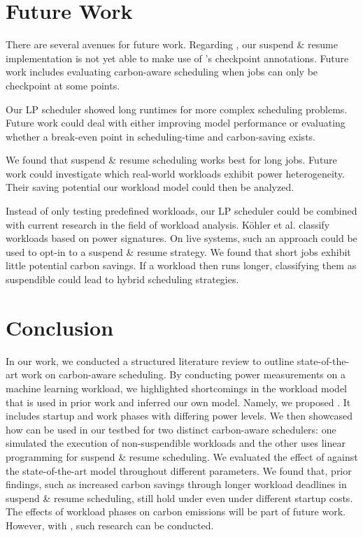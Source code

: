 \section{Future Work} \label{sec:future_work}

There are several avenues for future work.
Regarding \programname{}, our suspend \& resume implementation is not yet able to make use of \modelname{}'s checkpoint annotations. Future work includes evaluating carbon-aware scheduling when jobs can only be checkpoint at some points.

Our LP scheduler showed long runtimes for more complex scheduling problems.
Future work could deal with either improving model performance  or evaluating whether a break-even point in scheduling-time and carbon-saving exists.

We found that suspend \& resume scheduling works best for long jobs.
Future work could investigate which real-world workloads exhibit power heterogeneity.
Their saving potential our workload model could then be analyzed.

Instead of only testing predefined workloads, our LP scheduler could be combined with current research in the field of workload analysis. 
Köhler et al. \cite{kohler_recognizing_2021} classify workloads based on power signatures. 
On live systems, such an approach could be used to opt-in to a suspend \& resume strategy. 
We found that short jobs exhibit little potential carbon savings. 
If a workload then runs longer, classifying them as suspendible could lead to hybrid scheduling strategies.  

\section{Conclusion}

In our work, we conducted a structured literature review to outline state-of-the-art work on carbon-aware scheduling.
By conducting power measurements on a machine learning workload, we highlighted shortcomings in the workload model that is used in prior work and inferred our own model.
Namely, we proposed \modelname{}. 
It includes startup and work phases with differing power levels.
We then showcased how \modelname{} can be used in our testbed \programname for two distinct carbon-aware schedulers:
one simulated the execution of non-suspendible workloads and the other uses linear programming for suspend \& resume scheduling.
We evaluated the effect of \modelname{} against the state-of-the-art model throughout different parameters.
We found that, prior findings, such as increased carbon savings through longer workload deadlines in suspend \& resume scheduling, still hold under \modelname{} even under different startup costs.
The effects of workload phases on carbon emissions will be part of future work. 
However, with \programname{}, such research can be conducted.